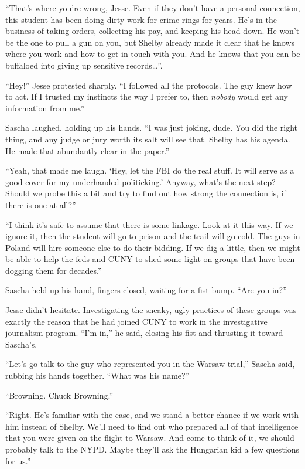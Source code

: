 \documentclass[12pt]{book}
\begin{document}
``That's where you're wrong, Jesse.  Even if they don't have a personal connection, this student has been doing dirty work for crime rings for years.  He's in the business of taking orders, collecting his pay, and keeping his head down.  He won't be the one to pull a gun on you, but Shelby already made it clear that he knows where you work and how to get in touch with you.  And he knows that you can be buffaloed into giving up sensitive records\dots''.

``Hey!'' Jesse protested sharply.  ``I followed all the protocols.  The guy knew how to act.  If I trusted my instincts the way I prefer to, then \emph{nobody} would get any information from me.''

Sascha laughed, holding up his hands.  ``I was just joking, dude.  You did the right thing, and any judge or jury worth its salt will see that.  Shelby has his agenda.  He made that abundantly clear in the paper.''

``Yeah, that made me laugh.  `Hey, let the FBI do the real stuff.  It will serve as a good cover for my underhanded politicking.'  Anyway, what's the next step?  Should we probe this a bit and try to find out how strong the connection is, if there is one at all?''

``I think it's safe to assume that there is some linkage.  Look at it this way.  If we ignore it, then the student will go to prison and the trail will go cold.  The guys in Poland will hire someone else to do their bidding.  If we dig a little, then we might be able to help the feds and CUNY to shed some light on groups that have been dogging them for decades.''

Sascha held up his hand, fingers closed, waiting for a fist bump.  ``Are you in?''

Jesse didn't hesitate.  Investigating the sneaky, ugly practices of these groups was exactly the reason that he had joined CUNY to work in the investigative journalism program.  ``I'm in,'' he said, closing his fist and thrusting it toward Sascha's.

``Let's go talk to the guy who represented you in the Warsaw trial,'' Sascha said, rubbing his hands together.  ``What was his name?''

``Browning.  Chuck Browning.''

``Right.  He's familiar with the case, and we stand a better chance if we work with him instead of Shelby.  We'll need to find out who prepared all of that intelligence that you were given on the flight to Warsaw.  And come to think of it, we should probably talk to the NYPD.  Maybe they'll ask the Hungarian kid a few questions for us.''
\end{document}
